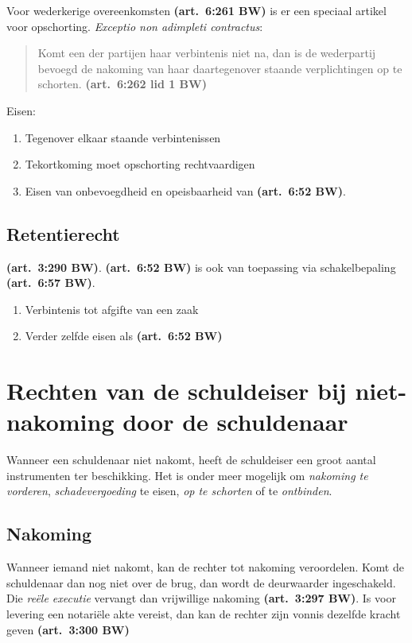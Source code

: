 \documentclass[a4paper]{article}
\newcommand{\art}[1]{\textbf{(art.~#1 BW)}\xspace}
\begin{document}
Voor wederkerige overeenkomsten \art{6:261} is er een speciaal artikel voor
opschorting. \emph{Exceptio non adimpleti contractus}:

\begin{quote}

  Komt een der partijen haar verbintenis niet na, dan is de wederpartij
  bevoegd de nakoming van haar daartegenover staande verplichtingen op te
  schorten. \art{6:262 lid 1}

\end{quote}

Eisen:
\begin{enumerate}
  \item Tegenover elkaar staande verbintenissen
  \item Tekortkoming moet opschorting rechtvaardigen
  \item Eisen van onbevoegdheid en opeisbaarheid van \art{6:52}.
\end{enumerate}

\subsection{Retentierecht}

\art{3:290}. \art{6:52} is ook van toepassing via schakelbepaling \art{6:57}.

\begin{enumerate}
  \item Verbintenis tot afgifte van een zaak
  \item Verder zelfde eisen als \art{6:52}
\end{enumerate}

\section{Rechten van de schuldeiser bij niet-nakoming door de schuldenaar}

Wanneer een schuldenaar niet nakomt, heeft de schuldeiser een groot aantal
instrumenten ter beschikking. Het is onder meer mogelijk om \emph{nakoming te
vorderen}, \emph{schadevergoeding} te eisen, \emph{op te schorten} of te
\emph{ontbinden}.

\subsection{Nakoming}

Wanneer iemand niet nakomt, kan de rechter tot nakoming veroordelen. Komt de
schuldenaar dan nog niet over de brug, dan wordt de deurwaarder ingeschakeld.
Die \emph{re\"ele executie} vervangt dan vrijwillige nakoming \art{3:297}. Is voor
levering een notari\"ele akte vereist, dan kan de rechter zijn vonnis dezelfde
kracht geven \art{3:300}
\end{document}
